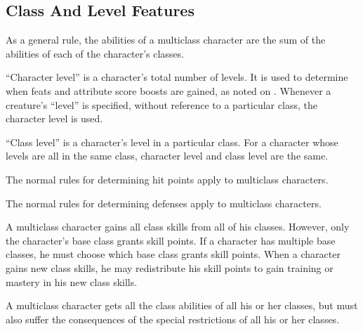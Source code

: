     \subsection{Class And Level Features}
        As a general rule, the abilities of a multiclass character are the sum
        of the abilities of each of the character's classes.

        ``Character level'' is a character's total number of levels.
        It is used to determine when feats and attribute score boosts are gained, as noted on .
        Whenever a creature's ``level'' is specified, without reference to a particular class, the character level is used.

        \par ``Class level'' is a character's level in a particular class.
        For a character whose levels are all in the same class, character level and class level are the same.

        The normal rules for determining hit points apply to multiclass characters.

        The normal rules for determining defenses apply to multiclass characters.

        A multiclass character gains all class skills from all of his classes.
        However, only the character's base class grants skill points.
        If a character has multiple base classes, he must choose which base class grants skill points.
        When a character gains new class skills, he may redistribute his skill points to gain training or mastery in his new class skills.

        A multiclass character gets all the class abilities of all his or her classes, but must also suffer the consequences of the special restrictions of all his or her classes.

